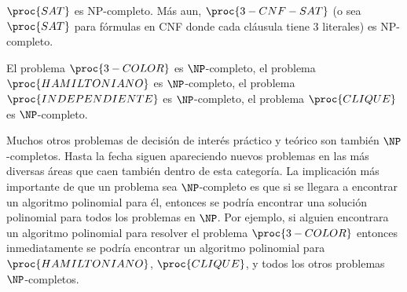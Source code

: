 \begin{teorema}[(Cook)]
$\proc{SAT}$ es NP-completo. M\'as aun, $\proc{3-CNF-SAT}$ (o sea $\proc{SAT}$ para f\'ormulas en CNF donde cada 
cl\'ausula tiene 3 literales) es NP-completo.
\end{teorema}

\begin{teorema}
El problema $\proc{3-COLOR}$ es $\NP$-completo,
el problema $\proc{HAMILTONIANO}$ es $\NP$-completo,
el problema $\proc{INDEPENDIENTE}$ es $\NP$-completo,
el problema $\proc{CLIQUE}$ es $\NP$-completo.
\end{teorema}

Muchos otros problemas de decisión de interés práctico y teórico son tambi\'en $\NP$-completos.
Hasta la fecha siguen apareciendo nuevos problemas en las más diversas áreas que caen también dentro de esta categoría.
La implicación más importante de que un problema sea $\NP$-completo es que si se llegara a encontrar un algoritmo polinomial para él, entonces se podría encontrar una solución polinomial para todos los problemas en $\NP$.
Por ejemplo, si alguien encontrara un algoritmo polinomial para resolver el problema $\proc{3-COLOR}$ entonces inmediatamente se podría encontrar un algoritmo polinomial para $\proc{HAMILTONIANO}$, $\proc{CLIQUE}$, y todos los otros problemas $\NP$-completos.


